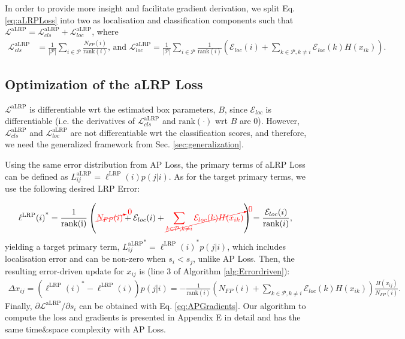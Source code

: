 \documentclass{article}
\begin{document}
In order to provide more insight and facilitate gradient derivation, we split Eq. \eqref{eq:aLRPLoss} into two as localisation and classification components such that $\mathcal{L}^\mathrm{aLRP}=\mathcal{L}^\mathrm{aLRP}_{cls}+\mathcal{L}^\mathrm{aLRP}_{loc}$, where
\begin{align}
    \label{eq:aLRPComponents}
    \mathcal{L}^\mathrm{aLRP}_{cls} &= \frac{1}{|\mathcal{P}|}\sum \limits_{i \in \mathcal{P}} \frac{N_{FP}(i)}{\mathrm{rank}(i)} \text{, and } \mathcal{L}^\mathrm{aLRP}_{loc} = \frac{1}{|\mathcal{P}|}\sum \limits_{i \in \mathcal{P}} \frac{1}{\mathrm{rank}(i)} \left(  \mathcal{E}_{loc}(i) +\sum \limits_{k \in \mathcal{P}, k \neq i}  \mathcal{E}_{loc}(k) H(x_{ik}) \right).
\end{align}

\subsection{Optimization of the aLRP Loss}
$\mathcal{L}^\mathrm{aLRP}$ is differentiable wrt the estimated box parameters, $B$, since $\mathcal{E}_{loc}$ is differentiable \cite{GIoULoss,UnitBox} (i.e. the derivatives of $\mathcal{L}^\mathrm{aLRP}_{cls}$ and $\mathrm{rank}(\cdot)$ wrt $B$ are $0$). However, $\mathcal{L}^\mathrm{aLRP}_{cls}$ and $\mathcal{L}^\mathrm{aLRP}_{loc}$ are not differentiable wrt the classification scores, and therefore, we need the generalized framework from Sec. \ref{sec:generalization}. 

Using the same error distribution from AP Loss, the primary terms of aLRP Loss can be defined as $L^\mathrm{aLRP}_{ij} = \ell^\mathrm{LRP} (i) p(j|i)$. As for the target primary terms, we use the following desired LRP Error:

\begin{align}
    {\ell^\mathrm{LRP}(i)}^* = \frac{1}{\mathrm{rank(i)}}
    \left(\textcolor{red}{\cancelto{0}{N_{FP}(i)}} + \mathcal{E}_{loc}(i) +  \textcolor{red}{\cancelto{0}{\sum \limits_{k \in \mathcal{P}, k \neq i}  \mathcal{E}_{loc}(k) H(x_{ik})}}\right)=\frac{ \mathcal{E}_{loc}(i)}{\mathrm{rank}(i)},
\end{align}
yielding a target primary term, ${L^\mathrm{aLRP}_{ij}}^*={\ell^\mathrm{LRP}(i)}^* p(j|i)$, which includes localisation error and can be non-zero when $s_i<s_j$, unlike AP Loss. Then, the resulting error-driven update for $x_{ij}$ is (line 3 of Algorithm \ref{alg:Errordriven}):
\begin{align}
      \Delta x_{ij} = \left({\ell^\mathrm{LRP}(i)}^*- \ell^\mathrm{LRP}(i) \right) p(j|i) = -\frac{ 1}{\mathrm{rank}(i)} \left( N_{FP}(i) + \sum \limits_{k \in \mathcal{P}, k \neq i}  \mathcal{E}_{loc}(k) H(x_{ik}) \right)  \frac{H(x_{ij})}{N_{FP}(i)}.
\end{align}
Finally, ${\partial \mathcal{L}^\mathrm{aLRP}}/{\partial s_i}$ can be obtained with Eq. \eqref{eq:APGradients}. Our algorithm to compute the loss and gradients is presented in Appendix E in detail and has the same time\&space complexity with AP Loss. 
\end{document}
